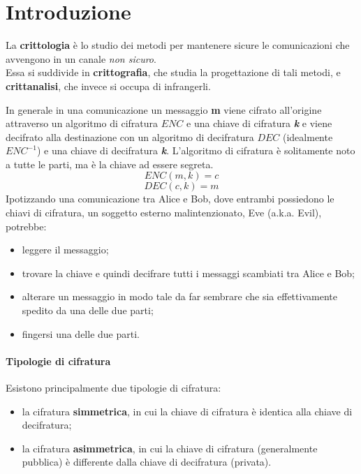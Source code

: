 \documentclass[12pt]{article}
\begin{document}
\maketitle
\tableofcontents

\section{Introduzione}
La \textbf{crittologia} è lo studio dei metodi per mantenere sicure le comunicazioni che avvengono in un canale \textit{non sicuro}. \\
Essa si suddivide in \textbf{crittografia}, che studia la progettazione di tali metodi, e \textbf{crittanalisi}, che invece si occupa di infrangerli.
\begin{center}
\end{center}
In generale in una comunicazione un messaggio \textbf{m} viene cifrato all'origine attraverso un algoritmo di cifratura \textbf{\(ENC\)} e una chiave di cifratura \textbf{\textit{k}} e viene decifrato alla destinazione con un algoritmo di decifratura \textbf{\(DEC\)} (idealmente \(ENC^{-1}\)) e una chiave di decifratura \textbf{\textit{k}}. L'algoritmo di cifratura è solitamente noto a tutte le parti, ma è la chiave ad essere segreta.
\[ENC(m,k)=c\]
\[DEC(c,k)=m\]
Ipotizzando una comunicazione tra Alice e Bob, dove entrambi possiedono le chiavi di cifratura, un soggetto esterno malintenzionato, Eve (a.k.a. Evil), potrebbe:
\begin{itemize}
\item leggere il messaggio;
\item trovare la chiave e quindi decifrare tutti i messaggi scambiati tra Alice e Bob;
\item alterare un messaggio in modo tale da far sembrare che sia effettivamente spedito da una delle due parti;
\item fingersi una delle due parti.
\end{itemize}
\paragraph{Tipologie di cifratura}
Esistono principalmente due tipologie di cifratura:
\begin{itemize}
\item la cifratura \textbf{simmetrica}, in cui la chiave di cifratura è identica alla chiave di decifratura;
\item la cifratura \textbf{asimmetrica}, in cui la chiave di cifratura (generalmente pubblica) è differente dalla chiave di decifratura (privata).
\end{itemize}
\end{document}

